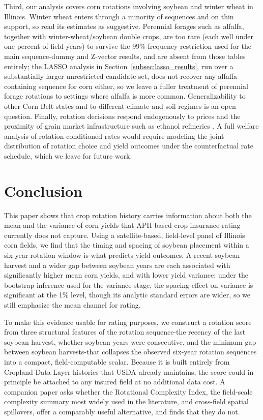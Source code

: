 \documentclass[12pt,letterpaper]{article}
\theoremstyle{remark}
\theoremstyle{remark}
\theoremstyle{plain}
\theoremstyle{definition}
\begin{document}
Third, our analysis covers corn rotations involving soybean and winter wheat in Illinois. Winter wheat enters through a minority of sequences and on thin support, so read its estimates as suggestive. Perennial forages such as alfalfa, together with winter-wheat/soybean double crops, are too rare (each well under one percent of field-years) to survive the 99\%-frequency restriction used for the main sequence-dummy and Z-vector results, and are absent from those tables entirely; the LASSO analysis in Section~\ref{subsec:lasso_results}, run over a substantially larger unrestricted candidate set, does not recover any alfalfa-containing sequence for corn either, so we leave a fuller treatment of perennial forage rotations to settings where alfalfa is more common. Generalizability to other Corn Belt states and to different climate and soil regimes is an open question. Finally, rotation decisions respond endogenously to prices and the proximity of grain market infrastructure such as ethanol refineries \citep{Pates2025,cheu2025}. A full welfare analysis of rotation-conditioned rates would require modeling the joint distribution of rotation choice and yield outcomes under the counterfactual rate schedule, which we leave for future work.

\section{\label{sec:conclusion}Conclusion}

This paper shows that crop rotation history carries information about both the mean and the variance of corn yields that APH-based crop insurance rating currently does not capture. Using a satellite-based, field-level panel of Illinois corn fields, we find that the timing and spacing of soybean placement within a six-year rotation window is what predicts yield outcomes. A recent soybean harvest and a wider gap between soybean years are each associated with significantly higher mean corn yields, and with lower yield variance; under the bootstrap inference used for the variance stage, the spacing effect on variance is significant at the 1\% level, though its analytic standard errors are wider, so we still emphasize the mean channel for rating.

To make this evidence usable for rating purposes, we construct a rotation score from three structural features of the rotation sequence-the recency of the last soybean harvest, whether soybean years were consecutive, and the minimum gap between soybean harvests-that collapses the observed six-year rotation sequences into a compact, field-computable scalar. Because it is built entirely from Cropland Data Layer histories that USDA already maintains, the score could in principle be attached to any insured field at no additional data cost. A companion paper asks whether the Rotational Complexity Index, the field-scale complexity summary most widely used in the literature, and cross-field spatial spillovers, offer a comparably useful alternative, and finds that they do not.
\end{document}
